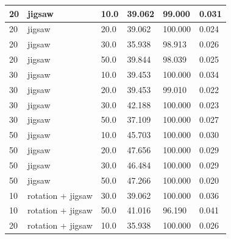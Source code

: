 \begin{longtable}{|| p{} | p{} | p{} | p{} | p{} | p{} ||}
    20                & jigsaw            & 10.0           & 39.062                    & 99.000                 & 0.031   \\ \hline
    20                & jigsaw            & 20.0           & 39.062                    & 100.000                & 0.024   \\ \hline
    20                & jigsaw            & 30.0           & 35.938                    & 98.913                 & 0.026   \\ \hline
    20                & jigsaw            & 50.0           & 39.844                    & 98.039                 & 0.025   \\ \hline
    30                & jigsaw            & 10.0           & 39.453                    & 100.000                & 0.034   \\ \hline
    30                & jigsaw            & 20.0           & 39.453                    & 99.010                 & 0.022   \\ \hline
    30                & jigsaw            & 30.0           & 42.188                    & 100.000                & 0.023   \\ \hline
    30                & jigsaw            & 50.0           & 37.109                    & 100.000                & 0.027   \\ \hline
    50                & jigsaw            & 10.0           & 45.703                    & 100.000                & 0.030   \\ \hline
    \rowcolor{green}
    50                & jigsaw            & 20.0           & 47.656                    & 100.000                & 0.029   \\ \hline
    50                & jigsaw            & 30.0           & 46.484                    & 100.000                & 0.029   \\ \hline
    50                & jigsaw            & 50.0           & 47.266                    & 100.000                & 0.020   \\ \hline
    10                & rotation + jigsaw & 30.0           & 39.062                    & 100.000                & 0.036   \\ \hline
    10                & rotation + jigsaw & 50.0           & 41.016                    & 96.190                 & 0.041   \\ \hline
    20                & rotation + jigsaw & 10.0           & 35.938                    & 100.000                & 0.026   \\ \hline

\end{longtable}
